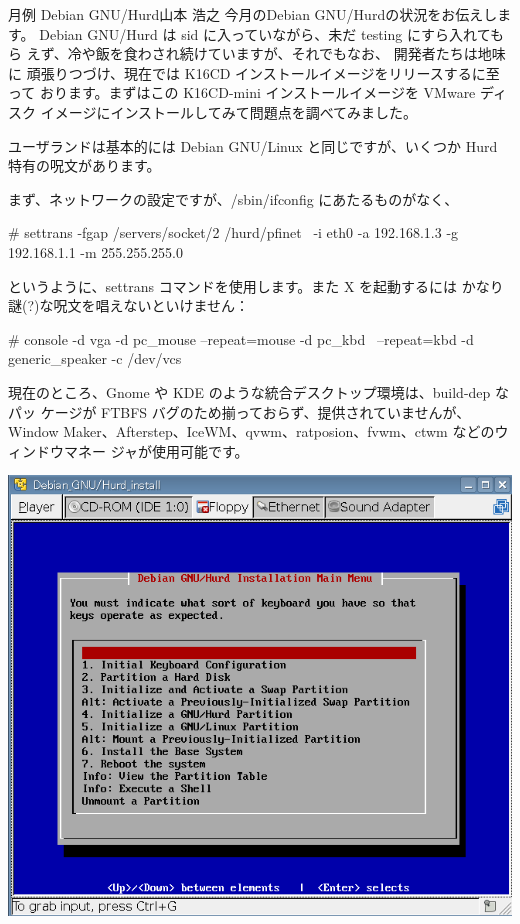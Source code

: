 \documentclass[mingoth,a4paper]{jsarticle}
\begin{document}
\begin{getsureiupdate}{月例 Debian GNU/Hurd}{山本 浩之}
今月のDebian GNU/Hurdの状況をお伝えします。
Debian GNU/Hurd は sid に入っていながら、未だ testing にすら入れてもら
 えず、冷や飯を食わされ続けていますが、それでもなお、 開発者たちは地味に
 頑張りつづけ、現在では K16CD インストールイメージをリリースするに至って
 おります。まずはこの K16CD-mini インストールイメージを VMware ディスク
 イメージにインストールしてみて問題点を調べてみました。

ユーザランドは基本的には Debian GNU/Linux と同じですが、いくつか Hurd
特有の呪文があります。

まず、ネットワークの設定ですが、/sbin/ifconfig にあたるものがなく、

\begin{commandline}
# settrans -fgap /servers/socket/2 /hurd/pfinet \
 -i eth0 -a 192.168.1.3 -g 192.168.1.1 -m 255.255.255.0
\end{commandline}

というように、settrans コマンドを使用します。また X を起動するには
かなり謎(?)な呪文を唱えないといけません：

\begin{commandline}
# console -d vga -d pc_mouse --repeat=mouse -d pc_kbd \
 --repeat=kbd -d generic_speaker -c /dev/vcs
\end{commandline}

現在のところ、Gnome や KDE のような統合デスクトップ環境は、build-dep なパッ
ケージが FTBFS バグのため揃っておらず、提供されていませんが、Window
Maker、Afterstep、IceWM、qvwm、ratposion、fvwm、ctwm などのウィンドウマネー
ジャが使用可能です。

\includegraphics[width=1\hsize]{image200805/hurd0.png}
\end{getsureiupdate}
\end{document}

